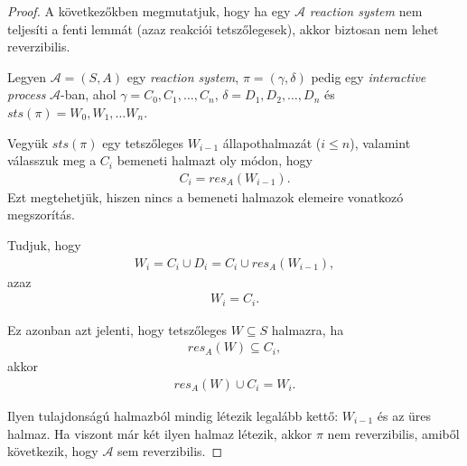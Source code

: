 \documentclass[12pt]{article}
\theoremstyle{definition}
\theoremstyle{remark}
\theoremstyle{plain}
\theoremstyle{plain}
\newcommand{\res}{\textit{res}}
\begin{document}
    \begin{proof}
        A következőkben megmutatjuk, hogy ha egy $\mathscr{A}$ \textit{reaction system} nem teljesíti a fenti lemmát (azaz reakciói tetszőlegesek), akkor biztosan nem lehet reverzibilis.

        Legyen $\mathscr{A} = (S, A)$ egy \textit{reaction system}, $\pi = (\gamma, \delta)$ pedig egy \textit{interactive process} $\mathscr{A}$-ban, ahol $\gamma = C_{0}, C_{1}, \ldots, C_{n}$, $\delta = D_{1}, D_{2},\ldots,D_{n}$ és $\textit{sts}(\pi)=W_{0},W_{1},\ldots W_{n}$.

        Vegyük $sts(\pi)$ egy tetszőleges $W_{i - 1}$ állapothalmazát ($i \leq n$), valamint válasszuk meg a $C_{i}$ bemeneti halmazt oly módon, hogy
        \begin{align*}
            C_{i} = \res_{A}(W_{i - 1}).
        \end{align*}
        Ezt megtehetjük, hiszen nincs a bemeneti halmazok elemeire vonatkozó megszorítás.

        Tudjuk, hogy
        \begin{align*}
            W_{i} = C_{i} \cup D_{i} = C_{i} \cup \res_{A}(W_{i - 1}),
        \end{align*}
        azaz
        \begin{align*}
            W_{i} = C_{i}.
        \end{align*}

        Ez azonban azt jelenti, hogy tetszőleges $W \subseteq S$ halmazra, ha
        \begin{align*}
            \res_{A}(W) \subseteq C_{i},
        \end{align*}
        akkor
        \begin{align*}
            \res_{A}(W) \cup C_{i} = W_{i}.
        \end{align*}

        Ilyen tulajdonságú halmazból mindig létezik legalább kettő: $W_{i-1}$ és az üres halmaz. Ha viszont már két ilyen halmaz létezik, akkor $\pi$ nem reverzibilis, amiből következik, hogy $\mathscr{A}$ sem reverzibilis.
    \end{proof}
\end{document}
